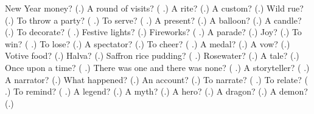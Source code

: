 \begin{tcolorbox}[breakable,colback=teal!4,colframe=teal!35!black,title={Before you move on}]
New Year money? (\textbf{}.) A round of visits? (\textbf{  }.) A rite? (\textbf{}.) A custom? (\textbf{}.) Wild rue? (\textbf{}.) To throw a party? (\textbf{ }.) To serve? (\textbf{ }.) A present? (\textbf{}.) A balloon? (\textbf{}.) A candle? (\textbf{}.) To decorate? (\textbf{ }.) Festive lights? (\textbf{}.) Fireworks? (\textbf{ }.) A parade? (\textbf{}.) Joy? (\textbf{}.) To win? (\textbf{ }.) To lose? (\textbf{}.) A spectator? (\textbf{}.) To cheer? (\textbf{ }.) A medal? (\textbf{}.) A vow? (\textbf{}.) Votive food? (\textbf{}.) Halva? (\textbf{}.) Saffron rice pudding? (\textbf{ }.) Rosewater? (\textbf{}.) A tale? (\textbf{}.) Once upon a time? (\textbf{ }.) There was one and there was none? (\textbf{   }.) A storyteller? (\textbf{ }.) A narrator? (\textbf{}.) What happened? (\textbf{}.) An account? (\textbf{}.) To narrate? (\textbf{ }.) To relate? (\textbf{ }.) To remind? (\textbf{ }.) A legend? (\textbf{}.) A myth? (\textbf{}.) A hero? (\textbf{}.) A dragon? (\textbf{}.) A demon? (\textbf{}.)
\end{tcolorbox}
